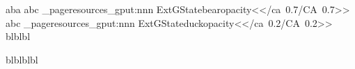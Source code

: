 \documentclass{article}
\begin{document}
aba \newpage abc\newpage
\ExplSyntaxOn
\pdf_pageresources_gput:nnn {ExtGState}{bearopacity}{<</ca~0.7/CA~0.7>>}
abc
\newpage
\pdf_pageresources_gput:nnn {ExtGState}{duckopacity}{<</ca~0.2/CA~0.2>>}
blblbl  blblblbl
\ExplSyntaxOff
\end{document}
